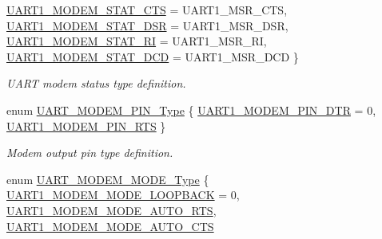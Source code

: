 \begin{DoxyCompactItemize}
\*
\hyperlink{group___u_a_r_t___public___types_gga2f7d223e1fdf6018ff08109bb1c976efa42a44429762b58e08934c4290026045b}{\-U\-A\-R\-T1\-\_\-\-M\-O\-D\-E\-M\-\_\-\-S\-T\-A\-T\-\_\-\-C\-T\-S} =  \-U\-A\-R\-T1\-\_\-\-M\-S\-R\-\_\-\-C\-T\-S, 
\hyperlink{group___u_a_r_t___public___types_gga2f7d223e1fdf6018ff08109bb1c976efaab5eaf0f8cc37785653464638f60fe15}{\-U\-A\-R\-T1\-\_\-\-M\-O\-D\-E\-M\-\_\-\-S\-T\-A\-T\-\_\-\-D\-S\-R} =  \-U\-A\-R\-T1\-\_\-\-M\-S\-R\-\_\-\-D\-S\-R, 
\hyperlink{group___u_a_r_t___public___types_gga2f7d223e1fdf6018ff08109bb1c976efa04c1c7ce8182b3afcd61583bda850bff}{\-U\-A\-R\-T1\-\_\-\-M\-O\-D\-E\-M\-\_\-\-S\-T\-A\-T\-\_\-\-R\-I} =  \-U\-A\-R\-T1\-\_\-\-M\-S\-R\-\_\-\-R\-I, 
\hyperlink{group___u_a_r_t___public___types_gga2f7d223e1fdf6018ff08109bb1c976efaa402d76f2f9133abea5f4be5e682479f}{\-U\-A\-R\-T1\-\_\-\-M\-O\-D\-E\-M\-\_\-\-S\-T\-A\-T\-\_\-\-D\-C\-D} =  \-U\-A\-R\-T1\-\_\-\-M\-S\-R\-\_\-\-D\-C\-D
 \}
\begin{DoxyCompactList}\small\item\em \-U\-A\-R\-T modem status type definition. \end{DoxyCompactList}\item 
enum \hyperlink{group___u_a_r_t___public___types_gabfc7ec239b7d598e6a2cc163e66b76fc}{\-U\-A\-R\-T\-\_\-\-M\-O\-D\-E\-M\-\_\-\-P\-I\-N\-\_\-\-Type} \{ \hyperlink{group___u_a_r_t___public___types_ggabfc7ec239b7d598e6a2cc163e66b76fcac831b7aff6c92cfb78dab2a0bf6bd97c}{\-U\-A\-R\-T1\-\_\-\-M\-O\-D\-E\-M\-\_\-\-P\-I\-N\-\_\-\-D\-T\-R} =  0, 
\hyperlink{group___u_a_r_t___public___types_ggabfc7ec239b7d598e6a2cc163e66b76fcafb10c5304a783fa1d234d72a9d1ff056}{\-U\-A\-R\-T1\-\_\-\-M\-O\-D\-E\-M\-\_\-\-P\-I\-N\-\_\-\-R\-T\-S}
 \}
\begin{DoxyCompactList}\small\item\em \-Modem output pin type definition. \end{DoxyCompactList}\item 
enum \hyperlink{group___u_a_r_t___public___types_ga55fc73bec4c58ad15d24b05095c4523a}{\-U\-A\-R\-T\-\_\-\-M\-O\-D\-E\-M\-\_\-\-M\-O\-D\-E\-\_\-\-Type} \{ \hyperlink{group___u_a_r_t___public___types_gga55fc73bec4c58ad15d24b05095c4523aa0c1c7817a58775f439acb102614f350b}{\-U\-A\-R\-T1\-\_\-\-M\-O\-D\-E\-M\-\_\-\-M\-O\-D\-E\-\_\-\-L\-O\-O\-P\-B\-A\-C\-K} =  0, 
\hyperlink{group___u_a_r_t___public___types_gga55fc73bec4c58ad15d24b05095c4523aa7e6608f4e3b1a68f463d3dfbfbf2f09d}{\-U\-A\-R\-T1\-\_\-\-M\-O\-D\-E\-M\-\_\-\-M\-O\-D\-E\-\_\-\-A\-U\-T\-O\-\_\-\-R\-T\-S}, 
\hyperlink{group___u_a_r_t___public___types_gga55fc73bec4c58ad15d24b05095c4523aaa290490ac4ee52b4fd0d2a89b038ac0e}{\-U\-A\-R\-T1\-\_\-\-M\-O\-D\-E\-M\-\_\-\-M\-O\-D\-E\-\_\-\-A\-U\-T\-O\-\_\-\-C\-T\-S}

\end{DoxyCompactItemize}

